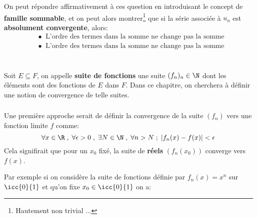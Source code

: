 On peut répondre affirmativement à ces question en introduisant le concept de \textbf{famille sommable}, et on peut alors montrer\footnote[6]{Hautement non trivial ...} que si la série associée à \(u_n\) est \textbf{absolument convergente}, alors:
\begin{align*}
   &\bullet \;\; \text{L'ordre des termes dans la somme ne change pas la somme} \\
   &\bullet \;\; \text{L'ordre des termes dans la somme ne change pas la somme}
\end{align*}
\chapter*{}
Soit \(E \subseteq F\), on appelle \textbf{suite de fonctions} une suite \((f_n)_n\in\N\) dont les éléments sont des fonctions de \(E\) dans \(F\). Dans ce chapitre, on cherchera à définir une notion de convergence de telle suites.

\subsection*{}
Une première approche serait de définir la convergence de la suite \((f_n)\) vers une fonction limite \(f\) comme:
\[
   \forall x \in \R \; , \; \forall \epsilon > 0 \; , \; \exists N \in \N \; , \; \forall n > N \; ; \; |f_n(x) - f(x)| < \epsilon
\]
Cela signifirait que pour un \(x_0\) fixé, la suite de \textbf{réels} \((f_n(x_0))\) converge vers \(f(x)\).\<

Par exemple si on considère la suite de fonctions définie par \(f_n(x) = x^n\) sur \(\icc{0}{1}\) et qu'on fixe \(x_0 \in \icc{0}{1}\) on a:

\begin{center}
\end{center}

